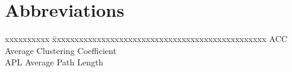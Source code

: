\chapter*{Abbreviations}
\begin{tabbing}
xxxxxxxxxx \= xxxxxxxxxxxxxxxxxxxxxxxxxxxxxxxxxxxxxxxxxxxxxxxx \kill
ACC \> Average Clustering Coefficient\\
APL \> Average Path Length\\
\end{tabbing}
